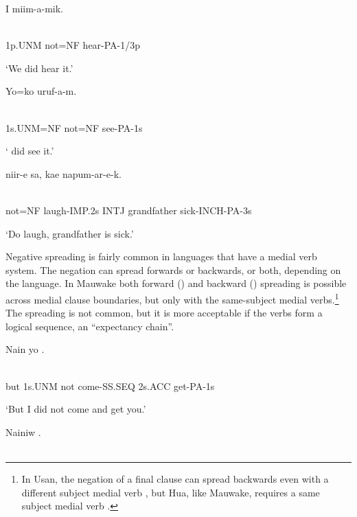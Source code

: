 \ea%
\label{ex:x1152}
\gll I    miim-a-mik. \\
      \\
\glt
\z

1p.UNM  not=NF  hear-PA-1/3p

`We did  hear it.'

\ea%
\label{ex:x1136}
\gll Yo=ko    uruf-a-m. \\
      \\
\glt
\z

1s.UNM=NF  not=NF  see-PA-1s

` did  see it.'

\ea%
\label{ex:x1137}
\gll {}  niir-e  sa,  kae  napum-ar-e-k. \\
      \\
\glt
\z

not=NF  laugh-IMP.2s  INTJ  grandfather  sick-INCH-PA-3s

`Do  laugh, grandfather is sick.'

Negative spreading is fairly common in languages that have a medial verb system. The negation can spread forwards or backwards, or both, depending on the language. In Mauwake both forward () and backward () spreading is possible across medial clause boundaries, but only with the same-subject medial verbs.\footnote{In Usan, the negation of a final clause can spread backwards even with a different subject medial verb  \citep[282]{Reesink1987}, but Hua, like Mauwake, requires a same subject medial verb \citep[408]{Haiman1980}.} The spreading is not common, but it is more acceptable if the verbs form a logical sequence, an ``expectancy chain''.

\ea%
\label{ex:x1138}
\gll Nain  yo      . \\
      \\
\glt
\z

but  1s.UNM  not  come-SS.SEQ  2s.ACC  get-PA-1s

`But I did not come and get you.'

\ea%
\label{ex:x1140}
\gll Nainiw      . \\
      \\
\glt
\z

